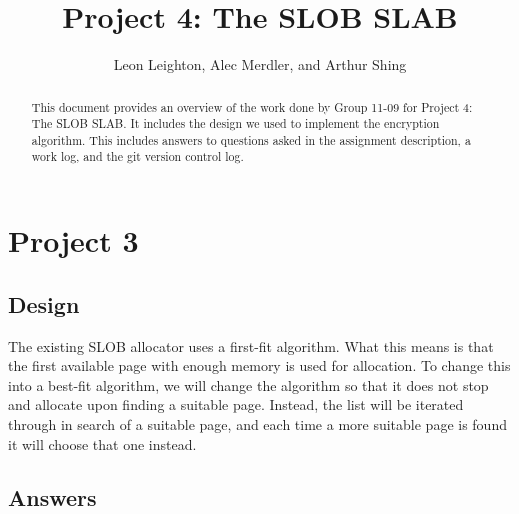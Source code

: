 \documentclass[journal, letterpaper, draftclsnofoot, onecolumn, 10pt]{IEEEtran}
\begin{document}
\title{Project 4: The SLOB SLAB}
\author{Leon Leighton, Alec Merdler, and Arthur Shing}

\begin{titlepage}
    \centering
    \maketitle
    \begin{abstract}
      This document provides an overview of the work done by Group 11-09 for Project 4: The SLOB SLAB.
      It includes the design we used to implement the encryption algorithm.
      This includes answers to questions asked in the assignment description, a work log, and the git version control log.
    \end{abstract}


\end{titlepage}
\tableofcontents
\clearpage

\section{Project 3}

\subsection{Design}

The existing SLOB allocator uses a first-fit algorithm. What this means is that the first available page with enough memory is used for allocation.
To change this into a best-fit algorithm, we will change the algorithm so that it does not stop and allocate upon finding a suitable page.
Instead, the list will be iterated through in search of a suitable page, and each time a more suitable page is found it will choose that one instead.


\subsection{Answers}

\end{document}

